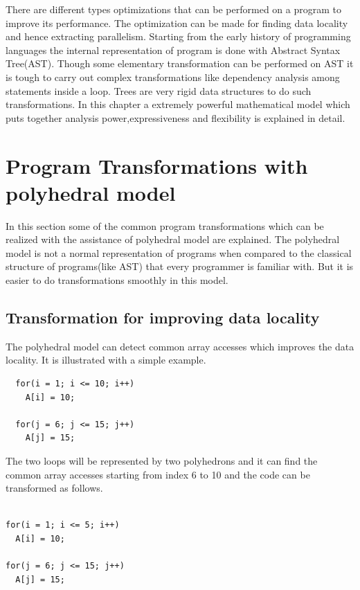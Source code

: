 \label{chap:background}

There are different types optimizations that can be performed on a program to improve its
performance. The optimization can be made for finding data locality and hence extracting
parallelism. Starting from the early history of programming languages the internal representation
of program is done with Abstract Syntax Tree(AST). Though some elementary transformation can
be performed on AST it is tough to carry out complex transformations like dependency analysis among
statements inside a loop. Trees are very rigid data structures to do such transformations.
In this chapter a extremely powerful mathematical model which puts together analysis power,expressiveness and flexibility is explained in detail.

\section{Program Transformations with polyhedral model}

In this section some of the common program transformations which can be realized with the
assistance of polyhedral model are explained. The polyhedral model is not a normal representation of programs when compared to the
classical structure of programs(like AST) that every programmer is familiar with. But
it is easier to do transformations smoothly in this model.

\subsection{Transformation for improving data locality}

The polyhedral model can detect common array accesses which improves the data locality. It is
illustrated with a simple example.
{\footnotesize
\begin{lstlisting}
  for(i = 1; i <= 10; i++)
    A[i] = 10;
  
  for(j = 6; j <= 15; j++)
    A[j] = 15;
\end{lstlisting}
}

The two loops will be represented by two polyhedrons and it can find the common 
array accesses starting from index 6 to 10 and the code can be transformed as follows.

{\footnotesize
\begin{lstlisting}

for(i = 1; i <= 5; i++)
  A[i] = 10;

for(j = 6; j <= 15; j++)
  A[j] = 15;
\end{lstlisting}
}

